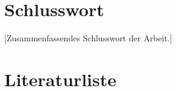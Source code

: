 \documentclass[pdftex,12pt,a4paper]{article}
\begin{document}


\newpage

\tableofcontents

\newpage



\newpage



\newpage



\newpage



\newpage

\section{Schlusswort}
[Zusammenfassendes Schlusswort der Arbeit.]

\newpage

\section{Literaturliste}

\printbibliography

\newpage

\printglossary[numberedsection]
\end{document}
